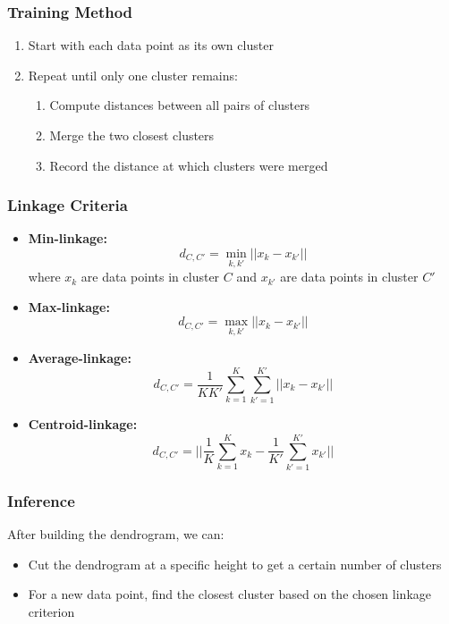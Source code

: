 \documentclass{article}
\begin{document}
\subsubsection{Training Method}
\begin{enumerate}
    \item Start with each data point as its own cluster
    \item Repeat until only one cluster remains:
    \begin{enumerate}
        \item Compute distances between all pairs of clusters
        \item Merge the two closest clusters
        \item Record the distance at which clusters were merged
    \end{enumerate}
\end{enumerate}

\subsubsection{Linkage Criteria}
\begin{itemize}
    \item \textbf{Min-linkage:} 
    \begin{equation}
        d_{C,C'} = \min_{k,k'} ||x_k - x_{k'}||
    \end{equation}
    where $x_k$ are data points in cluster $C$ and $x_{k'}$ are data points in cluster $C'$
    
    \item \textbf{Max-linkage:} 
    \begin{equation}
        d_{C,C'} = \max_{k,k'} ||x_k - x_{k'}||
    \end{equation}
    
    \item \textbf{Average-linkage:} 
    \begin{equation}
        d_{C,C'} = \frac{1}{KK'}\sum_{k=1}^K\sum_{k'=1}^{K'} ||x_k - x_{k'}||
    \end{equation}
    
    \item \textbf{Centroid-linkage:} 
    \begin{equation}
        d_{C,C'} = ||\frac{1}{K}\sum_{k=1}^K x_k - \frac{1}{K'}\sum_{k'=1}^{K'} x_{k'}||
    \end{equation}
\end{itemize}

\subsubsection{Inference}
After building the dendrogram, we can:
\begin{itemize}
    \item Cut the dendrogram at a specific height to get a certain number of clusters
    \item For a new data point, find the closest cluster based on the chosen linkage criterion
\end{itemize}
\end{document}
